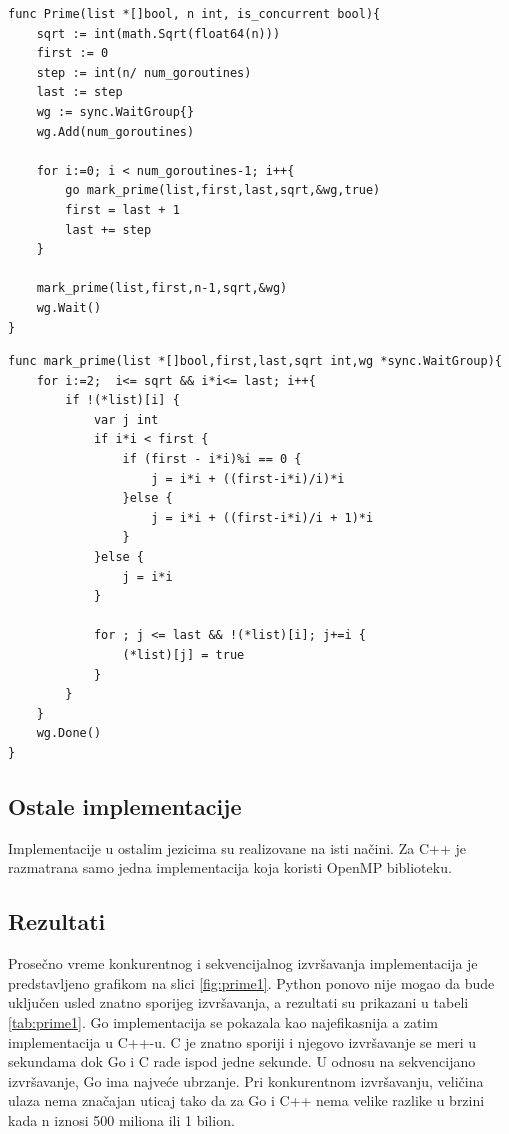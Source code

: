 \documentclass[12pt,oneside]{memoir}
\begin{document}
\begin{center}
\begin{lstlisting}[caption=Go implementacija konkurentne funkcije za određivanje prostih brojeva manjih od n,label={lst:prime1},float, backgroundcolor=\color{background}]
func Prime(list *[]bool, n int, is_concurrent bool){
	sqrt := int(math.Sqrt(float64(n)))
	first := 0
	step := int(n/ num_goroutines)
	last := step
	wg := sync.WaitGroup{}
	wg.Add(num_goroutines)

	for i:=0; i < num_goroutines-1; i++{
		go mark_prime(list,first,last,sqrt,&wg,true)
		first = last + 1
		last += step
	}

	mark_prime(list,first,n-1,sqrt,&wg)
	wg.Wait()
}
\end{lstlisting}
\end{center}

\begin{center}
\begin{lstlisting}[caption=Go implementacija konkurentne funkcije za označavanje prostih brojeva,label={lst:prime2},float, backgroundcolor=\color{background}]
func mark_prime(list *[]bool,first,last,sqrt int,wg *sync.WaitGroup){
	for i:=2;  i<= sqrt && i*i<= last; i++{
		if !(*list)[i] {
			var j int
			if i*i < first {
				if (first - i*i)%i == 0 {
					j = i*i + ((first-i*i)/i)*i
				}else {
					j = i*i + ((first-i*i)/i + 1)*i
				}
			}else {
				j = i*i
			}
		
			for ; j <= last && !(*list)[i]; j+=i {
				(*list)[j] = true
			}
		}
	}
	wg.Done()
}
\end{lstlisting}
\end{center}

\subsection{Ostale implementacije}
Implementacije u ostalim jezicima su realizovane na isti načini. Za C++ je razmatrana samo jedna implementacija koja koristi OpenMP biblioteku.

\subsection{Rezultati}

Prosečno vreme konkurentnog i sekvencijalnog izvršavanja implementacija je predstavljeno grafikom na slici \ref{fig:prime1}. Python ponovo nije mogao da bude uključen usled znatno sporijeg izvršavanja, a rezultati su prikazani u tabeli \ref{tab:prime1}. Go implementacija se pokazala kao najefikasnija a zatim implementacija u C++-u. C je znatno sporiji i njegovo izvršavanje se meri u sekundama dok Go i C rade ispod jedne sekunde. U odnosu na sekvencijano izvršavanje, Go ima najveće ubrzanje. Pri konkurentnom izvršavanju, veličina ulaza nema značajan uticaj tako da za Go i C++ nema velike razlike u brzini kada n iznosi 500 miliona ili 1 bilion. 
\end{document}
